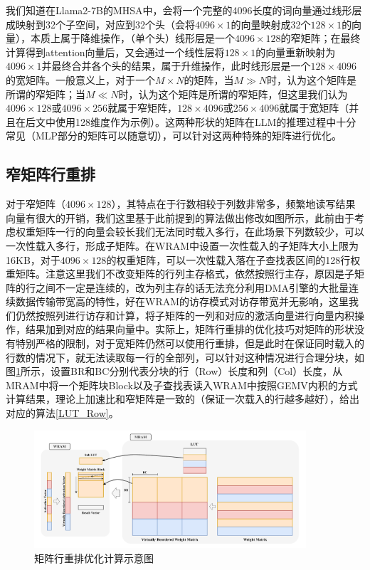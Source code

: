 我们知道在Llama2-7B的MHSA中，会将一个完整的4096长度的词向量通过线形层成映射到32个子空间，对应到32个头（会将$4096\times 1$的向量映射成32个$128\times 1$的向量），本质上属于降维操作，（单个头）线形层是一个$4096\times 128$的窄矩阵；在最终计算得到attention向量后，又会通过一个线性层将$128\times 1$的向量重新映射为$4096\times 1$并最终合并各个头的结果，属于升维操作，此时线形层是一个$128\times 4096$的宽矩阵。一般意义上，对于一个$M\times N$的矩阵，当$M\gg N$时，认为这个矩阵是所谓的窄矩阵；当$M\ll N$时，认为这个矩阵是所谓的窄矩阵，但这里我们认为$4096\times 128$或$4096\times 256$就属于窄矩阵，$128\times 4096$或$256\times 4096$就属于宽矩阵（并且在后文中使用128维度作为示例）。这两种形状的矩阵在LLM的推理过程中十分常见（MLP部分的矩阵可以随意切），可以针对这两种特殊的矩阵进行优化。

\subsection{窄矩阵行重排}
对于窄矩阵（$4096\times 128$），其特点在于行数相较于列数非常多，频繁地读写结果向量有很大的开销，我们这里基于此前提到的算法做出修改如图所示，此前由于考虑权重矩阵一行的向量会较长我们无法同时载入多行，在此场景下列数较少，可以一次性载入多行，形成子矩阵。在WRAM中设置一次性载入的子矩阵大小上限为16KB，对于$4096\times 128$的权重矩阵，可以一次性载入落在子查找表区间的128行权重矩阵。注意这里我们不改变矩阵的行列主存格式，依然按照行主存，原因是子矩阵的行之间不一定是连续的，改为列主存的话无法充分利用DMA引擎的大批量连续数据传输带宽高的特性，好在WRAM的访存模式对访存带宽并无影响\cite{BenchmarkingMutlu}，这里我们仍然按照列进行访存和计算，将子矩阵的一列和对应的激活向量进行向量内积操作，结果加到对应的结果向量中。实际上，矩阵行重排的优化技巧对矩阵的形状没有特别严格的限制，对于宽矩阵仍然可以使用行重排，但是此时在保证同时载入的行数的情况下，就无法读取每一行的全部列，可以针对这种情况进行合理分块，如图\ref{LUTRow}所示，设置BR和BC分别代表分块的行（Row）长度和列（Col）长度，从MRAM中将一个矩阵块Block以及子查找表读入WRAM中按照GEMV内积的方式计算结果，理论上加速比和窄矩阵是一致的（保证一次载入的行越多越好），给出对应的算法\ref{LUT_Row}。

\begin{figure}[!htbp]
	\centering
    \includegraphics[width=0.9\textwidth]{figures/LUTRow.pdf}
	\caption{矩阵行重排优化计算示意图}
    \label{LUTRow}
\end{figure}

